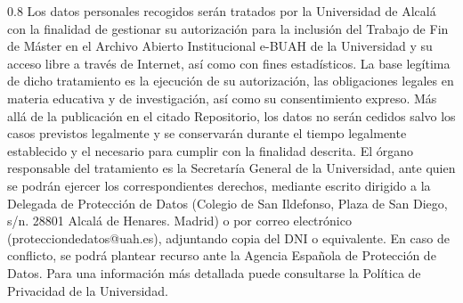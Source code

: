 \documentclass[11pt,a4paper,oneside]{article}
\begin{document}
\vspace{0.5cm}



\begin{spacing}{0.8}
\scriptsize Los datos personales recogidos serán tratados por la Universidad de
Alcalá con la finalidad de gestionar su autorización para la inclusión
del Trabajo de Fin de Máster en el Archivo Abierto Institucional
e-BUAH de la Universidad y su acceso libre a través de Internet, así
como con fines estadísticos. La base legítima de dicho tratamiento es
la ejecución de su autorización, las obligaciones legales en materia
educativa y de investigación, así como su consentimiento expreso. Más
allá de la publicación en el citado Repositorio, los datos no serán
cedidos salvo los casos previstos legalmente y se conservarán durante
el tiempo legalmente establecido y el necesario para cumplir con la
finalidad descrita. El órgano responsable del tratamiento es la
Secretaría General de la Universidad, ante quien se podrán ejercer los
correspondientes derechos, mediante escrito dirigido a la Delegada de
Protección de Datos (Colegio de San Ildefonso, Plaza de San Diego,
s/n. 28801 Alcalá de Henares. Madrid) o por correo electrónico
(protecciondedatos@uah.es), adjuntando copia del DNI o equivalente. En
caso de conflicto, se podrá plantear recurso ante la Agencia Española
de Protección de Datos. Para una información más detallada puede
consultarse la Política de Privacidad de la Universidad.
\end{spacing}




% 
\end{document}
